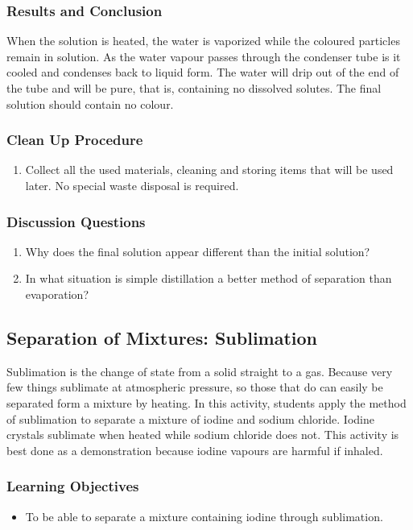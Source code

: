 \subsubsection*{Results and Conclusion}
When the solution is heated, the water is vaporized while the coloured particles remain in solution. As the water vapour passes through the condenser tube is it cooled and condenses back to liquid form. The water will drip out of the end of the tube and will be pure, that is, containing no dissolved solutes. The final solution should contain no colour.

\subsubsection*{Clean Up Procedure}
\begin{enumerate}
\item{Collect all the used materials, cleaning and storing items that will be used later. No special waste disposal is required.}
\end{enumerate}

\subsubsection*{Discussion Questions}
\begin{enumerate}
\item{Why does the final solution appear different than the initial solution?}
\item{In what situation is simple distillation a better method of separation than evaporation?}

\end{enumerate}
\subsection{Separation of Mixtures: Sublimation}
Sublimation is the change of state from a solid straight to a gas. Because very few things sublimate at atmospheric pressure, so those that do can easily be separated form a mixture by heating. In this activity, students apply the method of sublimation to separate a mixture of iodine and sodium chloride. Iodine crystals sublimate when heated while sodium chloride does not. This activity is best done as a demonstration because iodine vapours are harmful if inhaled.
\subsubsection*{Learning Objectives}
\begin{itemize}
\item{To be able to separate a mixture containing iodine through sublimation.}
\end{itemize}

